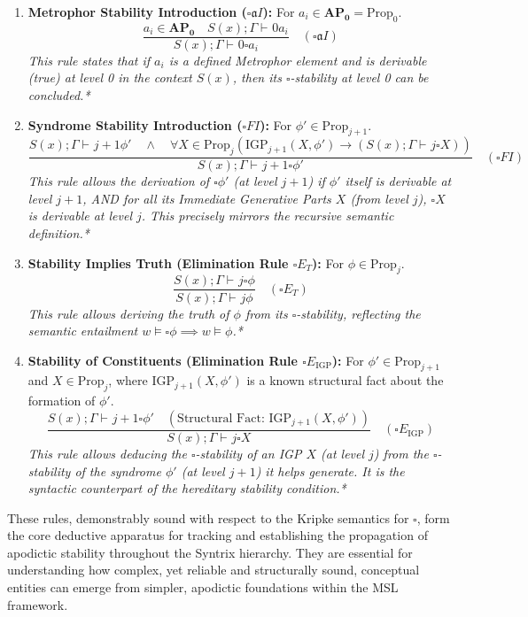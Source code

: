 \documentclass[
    12pt,              %
    a4paper,           %
    headings=normal,   %
    twoside=true,      %
    BCOR=8mm,          %
]{scrbook}
\newcommand{\BoxSyn}{\square}
\newcommand{\turnstilek}[1][]{\vdash^{#1}}
\newcommand{\APZero}{\mathbf{AP_0}}
\newcommand{\Propk}[1]{\text{Prop}_{#1}}
\newcommand{\IGPk}[1]{\text{IGP}_{#1}}
\begin{document}
\begin{enumerate}[label=(\alph*)]
    \item  \textbf{Metrophor Stability Introduction (\(\BoxSyn\mathfrak{a}I\)):} For \(a_i \in \APZero = \Propk{0}\).
        \[ \frac{a_i \in \APZero \quad S(x);\Gamma \turnstilek{0} a_i}{S(x); \Gamma \turnstilek{0} \BoxSyn a_i} \quad (\BoxSyn\mathfrak{a}I) \]
        \textit{This rule states that if \(a_i\) is a defined Metrophor element and is derivable (true) at level 0 in the context \(S(x)\), then its \(\BoxSyn\)-stability at level 0 can be concluded.*}

    \item  \textbf{Syndrome Stability Introduction (\(\BoxSyn FI\)):} For \(\phi' \in \Propk{j+1}\).
        \[ \frac{ S(x); \Gamma \turnstilek{j+1} \phi' \quad \land \quad \forall X \in \Propk{j} \left( \IGPk{j+1}(X, \phi') \rightarrow (S(x); \Gamma \turnstilek{j} \BoxSyn X) \right) }{S(x); \Gamma \turnstilek{j+1} \BoxSyn \phi'} \quad (\BoxSyn FI) \]
        \textit{This rule allows the derivation of \(\BoxSyn \phi'\) (at level \(j+1\)) if \(\phi'\) itself is derivable at level \(j+1\), AND for all its Immediate Generative Parts \(X\) (from level \(j\)), \(\BoxSyn X\) is derivable at level \(j\). This precisely mirrors the recursive semantic definition.*}

    \item  \textbf{Stability Implies Truth (Elimination Rule \(\BoxSyn E_T\)):} For \(\phi \in \Propk{j}\).
        \[ \frac{S(x); \Gamma \turnstilek{j} \BoxSyn \phi}{S(x); \Gamma \turnstilek{j} \phi} \quad (\BoxSyn E_T) \]
        \textit{This rule allows deriving the truth of \(\phi\) from its \(\BoxSyn\)-stability, reflecting the semantic entailment \(w \vDash \BoxSyn \phi \implies w \vDash \phi\).*}

    \item  \textbf{Stability of Constituents (Elimination Rule \(\BoxSyn E_{\text{IGP}}\)):} For \(\phi' \in \Propk{j+1}\) and \(X \in \Propk{j}\), where \(\IGPk{j+1}(X, \phi')\) is a known structural fact about the formation of \(\phi'\).
        \[ \frac{S(x); \Gamma \turnstilek{j+1} \BoxSyn \phi' \quad (\text{Structural Fact: } \IGPk{j+1}(X, \phi'))}{S(x); \Gamma \turnstilek{j} \BoxSyn X} \quad (\BoxSyn E_{\text{IGP}}) \]
        \textit{This rule allows deducing the \(\BoxSyn\)-stability of an IGP \(X\) (at level \(j\)) from the \(\BoxSyn\)-stability of the syndrome \(\phi'\) (at level \(j+1\)) it helps generate. It is the syntactic counterpart of the hereditary stability condition.*}
\end{enumerate}
These rules, demonstrably sound with respect to the Kripke semantics for \(\BoxSyn\), form the core deductive apparatus for tracking and establishing the propagation of apodictic stability throughout the Syntrix hierarchy. They are essential for understanding how complex, yet reliable and structurally sound, conceptual entities can emerge from simpler, apodictic foundations within the MSL framework.
\end{document}
